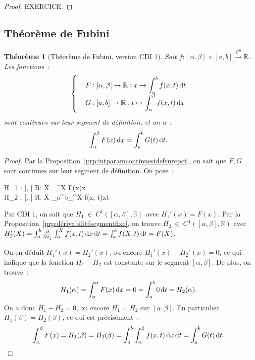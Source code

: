 \documentclass{report}
\newtheorem{thm}{Théorème}[chapter]
\theoremstyle{definition}
\theoremstyle{remark}
\numberwithin{equation}{section}
\newcommand{\R}{\mathbb R}
\newcommand{\toC}[1]{\xrightarrow{C^{#1}}}
\newcommand{\tocont}{\toC 0}
\newcommand{\CDII}{{CDI 1}}
\begin{document}
			\begin{proof} EXERCICE.
			\end{proof}

		\subsection{Théorème de Fubini}
			\begin{thm}[Théorème de Fubini, version \CDII] Soit $f : [\alpha, \beta] \times [a, b] \tocont \R$. Les fonctions~:
			\begin{equation}
				\begin{cases}
					&\displaystyle F : [\alpha, \beta] \to \R : x \mapsto \int_a^bf(x, t)\dif t \\
					&\displaystyle G : [a, b] \to \R : t \mapsto \int_\alpha^\beta f(x, t)\dif x
				\end{cases}
			\end{equation}
			sont continues sur leur segment de définition, et on a~:
			\begin{equation}
				\int_\alpha^\beta F(x)\dif x = \int_a^b G(t)\dif t.
			\end{equation}
			\end{thm}

			\begin{proof} Par la Proposition~\ref{prp:intparamcontinuesidefsurcpct}, on sait que $F, G$ sont continues sur leur segment de définition. On pose~:
			\begin{numcases}
				\displaystyle H_1 : [\alpha, \beta] \to \R : X \mapsto \int_\alpha^X F(x)\dif x \\
				\displaystyle H_2 : [\alpha, \beta] \to \R : X \mapsto \int_a^b\int_\alpha^X f(x, t)\dif x\dif t
			\end{numcases}
			Par \CDII, on sait que $H_1~\in~C^1([\alpha, \beta], \R)$ avec $H_1'(x) = F(x)$. Par la Proposition~\ref{prp:dérivabilitésegmentfixe}, on trouve
			$H_2~\in~C^1([\alpha, \beta], \R)$ avec $H_2'(X) = \int_a^b\pd {}{x_i}\int_\alpha^X f(x, t)\dif x\dif t = \int_a^b f(X, t)\dif t = F(X)$.

			On en déduit $H_1'(x) = H_2'(x)$, ou encore $H_1'(x)-H_2'(x) = 0$, ce qui indique que la fonction $H_1-H_2$ est constante sur le segment
			$[\alpha, \beta]$. De plus, on trouve~:
			\begin{equation}
				H_1(\alpha) = \int_\alpha^\alpha F(x)\dif x = 0 = \int_a^b0\dif t = H_2(\alpha).
			\end{equation}
			On a donc $H_1-H_2 = 0$, ou encore $H_1=H_2$ sur $[\alpha, \beta]$. En particulier, $H_1(\beta) = H_2(\beta)$, ce qui est précisément~:
			\begin{equation}
				\int_\alpha^\beta F(x) = H_1(\beta) = H_2(\beta) = \int_a^b\int_\alpha^\beta f(x, t)\dif x\dif t = \int_a^b G(t)\dif t.
			\end{equation}
			\end{proof}
\end{document}
